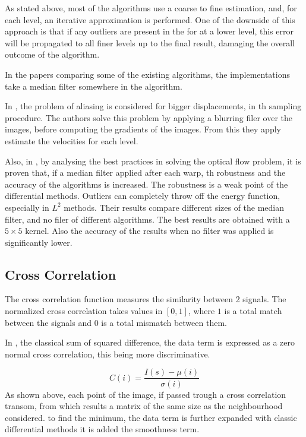 \documentclass[12pt,a4paper,twoside]{report}
\begin{document}
As stated above, most of the algorithms use a coarse to fine estimation, and, for each level, an iterative approximation is performed.
One of the downside of this approach is that if any outliers are present in the for at a lower level, this error will be propagated to all finer levels up to the final result, damaging the overall outcome of the algorithm.

In the papers comparing some of the existing algorithms, the implementations take a median filter somewhere in the algorithm.

In \cite{fleet2006}, the problem of aliasing is considered for bigger displacements, in th sampling procedure. The authors solve this problem by applying a blurring filer over the images, before computing the gradients of the images. From this they apply estimate the velocities for each level.

Also, in \cite{sun2010}, by analysing the best practices in solving the optical flow problem, it is proven that, if a median filter applied after each warp, th robustness and the accuracy of the algorithms is increased.
The robustness is a weak point of the differential methods. Outliers can completely throw off the energy function, especially in $L^2$ methods.
Their results compare different sizes of the median filter, and no filer of different algorithms. The best results are obtained with a $5 \times 5$ kernel. Also the accuracy of the results when no filter was applied is significantly lower.  


\subsection{Cross Correlation}
The cross correlation function measures the similarity between 2 signals.
The normalized cross correlation takes values in $[0,1]$, where $1$ is a total match between the signals and $0$ is a total mismatch between them.

In \cite{drulea2013}, the classical sum of squared difference, the data term is expressed as a zero normal cross correlation, this being more discriminative. 
 
 \begin{equation}
 C(i) = \frac{I(s)- \mu(i)}{\sigma(i)}
 \end{equation}
As shown above, each point of the image, if passed trough a cross correlation transom, from which results a matrix of the same size as the neighbourhood considered. to find the minimum, the data term is further expanded with classic differential methods it is added the smoothness term.
\end{document}

